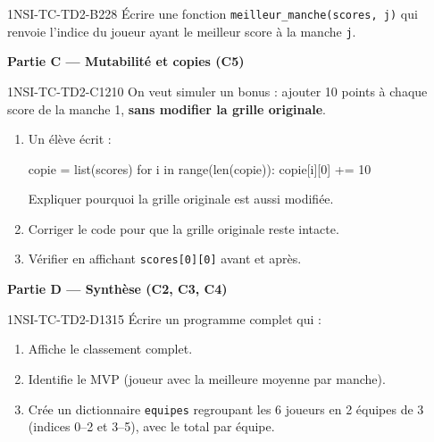 \begin{exercice}{1NSI-TC-TD2-B2}{2}{8}
Écrire une fonction \lstinline{meilleur_manche(scores, j)} qui renvoie
l'indice du joueur ayant le meilleur score à la manche \lstinline{j}.
\end{exercice}

\textbf{Partie C --- Mutabilité et copies (C5)}

\begin{exercice}{1NSI-TC-TD2-C1}{2}{10}
On veut simuler un bonus : ajouter 10 points à chaque score de la manche 1,
\textbf{sans modifier la grille originale}.

\begin{enumerate}
  \item Un élève écrit :
\begin{python}
copie = list(scores)
for i in range(len(copie)):
    copie[i][0] += 10
\end{python}
        Expliquer pourquoi la grille originale est aussi modifiée.
  \item Corriger le code pour que la grille originale reste intacte.
  \item Vérifier en affichant \lstinline{scores[0][0]} avant et après.
\end{enumerate}
\end{exercice}

\textbf{Partie D --- Synthèse (C2, C3, C4)}

\begin{exercice}{1NSI-TC-TD2-D1}{3}{15}
Écrire un programme complet qui :
\begin{enumerate}
  \item Affiche le classement complet.
  \item Identifie le MVP (joueur avec la meilleure moyenne par manche).
  \item Crée un dictionnaire \lstinline{equipes} regroupant les 6 joueurs
        en 2 équipes de 3 (indices 0--2 et 3--5), avec le total par équipe.
\end{enumerate}
\end{exercice}
